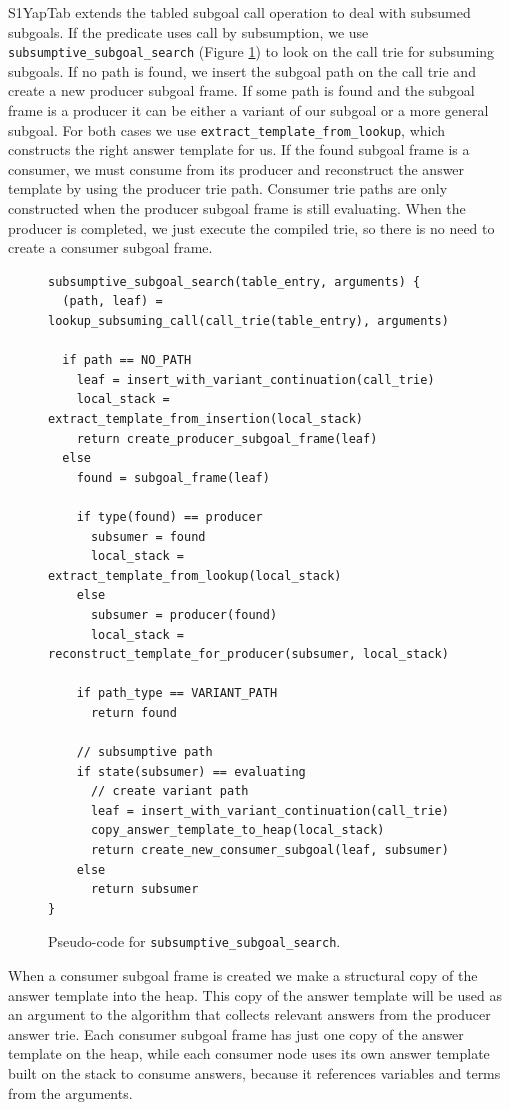 S1YapTab extends the tabled subgoal call operation to deal with subsumed subgoals.
If the predicate uses call by subsumption, we use \texttt{subsumptive\_subgoal\_search}
(Figure \ref{fig:subsumptive_subgoal_search}) to look on the call trie for subsuming subgoals.
If no path is found, we insert the subgoal path on the call trie and create a new producer
subgoal frame. If some path is found and the subgoal frame is a producer it can be either
a variant of our subgoal or a more general subgoal. For both cases
we use \texttt{extract\_template\_from\_lookup}, which constructs the right answer template for us.
If the found subgoal frame is a consumer, we must consume from its producer and reconstruct the answer
template by using the producer trie path.
Consumer trie paths are only constructed when the producer subgoal frame is still evaluating.
When the producer is completed, we just execute the compiled trie, so there is no need
to create a consumer subgoal frame.

\begin{figure}[ht]
\begin{Verbatim}
subsumptive_subgoal_search(table_entry, arguments) {
  (path, leaf) = lookup_subsuming_call(call_trie(table_entry), arguments)
  
  if path == NO_PATH
    leaf = insert_with_variant_continuation(call_trie)
    local_stack = extract_template_from_insertion(local_stack)
    return create_producer_subgoal_frame(leaf)
  else
    found = subgoal_frame(leaf)
    
    if type(found) == producer
      subsumer = found
      local_stack = extract_template_from_lookup(local_stack)
    else
      subsumer = producer(found)
      local_stack = reconstruct_template_for_producer(subsumer, local_stack)
    
    if path_type == VARIANT_PATH
      return found
    
    // subsumptive path
    if state(subsumer) == evaluating
      // create variant path
      leaf = insert_with_variant_continuation(call_trie)
      copy_answer_template_to_heap(local_stack)
      return create_new_consumer_subgoal(leaf, subsumer)
    else
      return subsumer
}
\end{Verbatim}
\caption{Pseudo-code for \texttt{subsumptive\_subgoal\_search}.}
\label{fig:subsumptive_subgoal_search}
\end{figure}

When a consumer subgoal frame is created we make a structural copy of the answer template
into the heap. This copy of the answer template will be used as an argument
to the algorithm that collects relevant answers from the producer answer trie.
Each consumer subgoal frame has just one copy of the answer template on the heap,
while each consumer node uses its own answer template built on the stack to
consume answers, because it references variables
and terms from the arguments.

